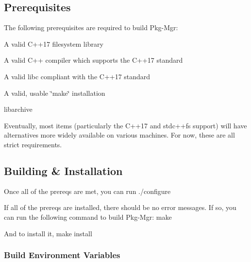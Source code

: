 \subsection*{Prerequisites}

The following prerequisites are required to build Pkg-\/\+Mgr\+:
\begin{DoxyItemize}
\item A valid C++17 filesystem library
\item A valid C++ compiler which supports the C++17 standard
\item A valid libc compliant with the C++17 standard
\item A valid, usable \char`\"{}make\char`\"{} installation
\item libarchive
\end{DoxyItemize}

Eventually, most items (particularly the C++17 and stdc++fs support) will have alternatives more widely available on various machines. For now, these are all strict requirements.

\subsection*{Building \& Installation}

Once all of the prereqs are met, you can run ./configure

If all of the prereqs are installed, there should be no error messages. If so, you can run the following command to build Pkg-\/\+Mgr\+: make

And to install it, make install

\subsubsection*{Build Environment Variables}

